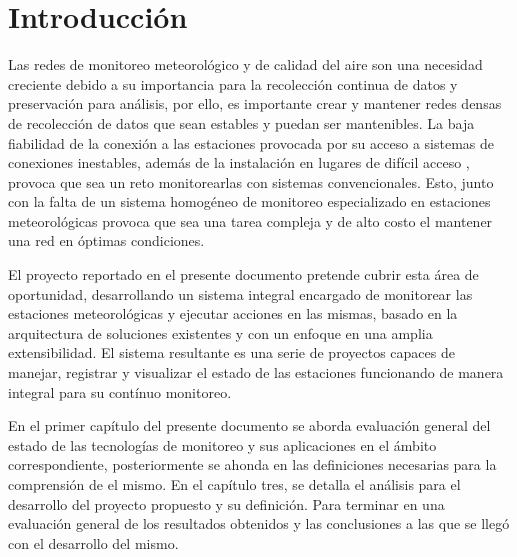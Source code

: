 \chapter*{Introducción}\label{introduccion}

Las redes de monitoreo meteorológico y de calidad del aire son una necesidad creciente debido a su importancia para la recolección continua de datos y preservación para análisis, por ello, es importante crear y mantener redes densas de recolección de datos que sean estables y puedan ser mantenibles. La baja fiabilidad de la conexión a las estaciones provocada por su acceso a sistemas de conexiones inestables, además de la instalación en lugares de difícil acceso \cite{muller_sensors_and_the_city}, provoca que sea un reto monitorearlas con sistemas convencionales. Esto, junto con la falta de un sistema homogéneo de monitoreo especializado en estaciones meteorológicas provoca que sea una tarea compleja y de alto costo el mantener una red en óptimas condiciones.

El proyecto reportado en el presente documento pretende cubrir esta área de oportunidad, desarrollando un sistema integral encargado de monitorear las estaciones meteorológicas y ejecutar acciones en las mismas, basado en la arquitectura de soluciones existentes y con un enfoque en una amplia extensibilidad. El sistema resultante es una serie de proyectos capaces de manejar, registrar y visualizar el estado de las estaciones funcionando de manera integral para su contínuo monitoreo.

En el primer capítulo del presente documento se aborda evaluación general del estado de las tecnologías de monitoreo y sus aplicaciones en el ámbito correspondiente, posteriormente se ahonda en las definiciones necesarias para la comprensión de el mismo. En el capítulo tres, se detalla el análisis para el desarrollo del proyecto propuesto y su definición. Para terminar en una evaluación general de los resultados obtenidos y las conclusiones a las que se llegó con el desarrollo del mismo.
